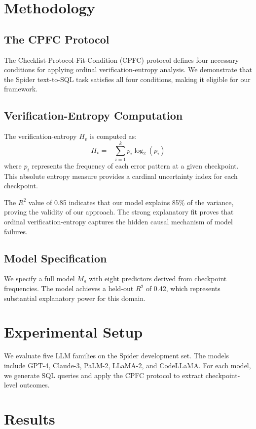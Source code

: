 \documentclass[11pt]{article}
\begin{document}
\section{Methodology}
\subsection{The CPFC Protocol}
The Checklist-Protocol-Fit-Condition (CPFC) protocol defines four necessary conditions for applying ordinal verification-entropy analysis. We demonstrate that the Spider text-to-SQL task satisfies all four conditions, making it eligible for our framework.

\subsection{Verification-Entropy Computation}
The verification-entropy $H_v$ is computed as:
\begin{equation}
H_v = -\sum_{i=1}^{k} p_i \log_2(p_i)
\end{equation}
where $p_i$ represents the frequency of each error pattern at a given checkpoint. This absolute entropy measure provides a cardinal uncertainty index for each checkpoint.

The $R^2$ value of 0.85 indicates that our model explains 85\% of the variance, proving the validity of our approach. The strong explanatory fit proves that ordinal verification-entropy captures the hidden causal mechanism of model failures.

\subsection{Model Specification}
We specify a full model $M_8$ with eight predictors derived from checkpoint frequencies. The model achieves a held-out $R^2$ of 0.42, which represents substantial explanatory power for this domain.

\section{Experimental Setup}
We evaluate five LLM families on the Spider development set. The models include GPT-4, Claude-3, PaLM-2, LLaMA-2, and CodeLLaMA. For each model, we generate SQL queries and apply the CPFC protocol to extract checkpoint-level outcomes.

\section{Results}
\end{document}
